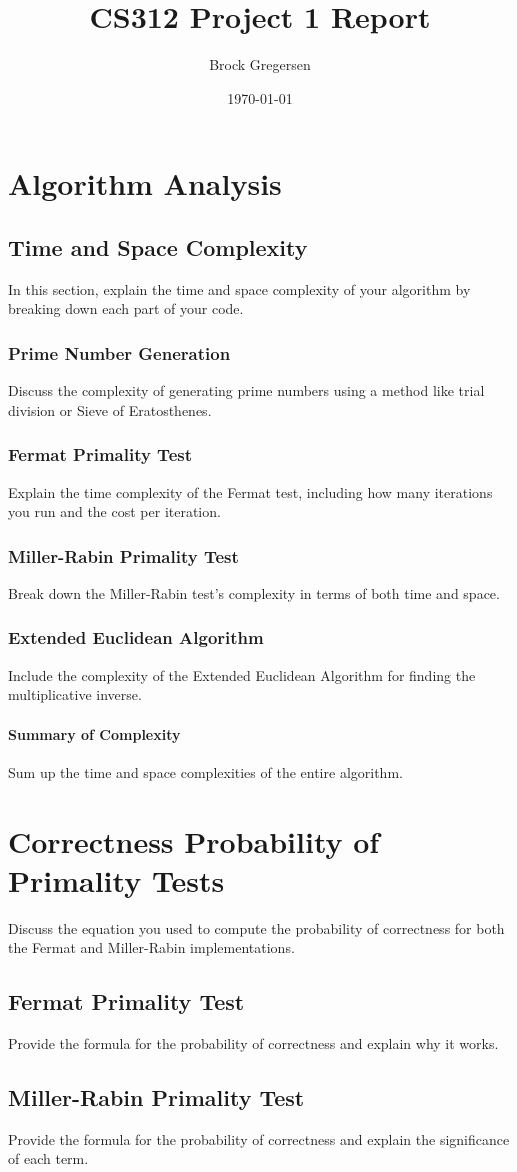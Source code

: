 \documentclass[12pt]{article}
\title{CS312 Project 1 Report}
\author{Brock Gregersen}
\date{\today}
\begin{document}
\maketitle

\tableofcontents
\newpage


\section{Algorithm Analysis}

\subsection{Time and Space Complexity}
In this section, explain the time and space complexity of your algorithm by breaking down each part of your code. 

\subsubsection{Prime Number Generation}
Discuss the complexity of generating prime numbers using a method like trial division or Sieve of Eratosthenes.

\subsubsection{Fermat Primality Test}
Explain the time complexity of the Fermat test, including how many iterations you run and the cost per iteration.

\subsubsection{Miller-Rabin Primality Test}
Break down the Miller-Rabin test's complexity in terms of both time and space.

\subsubsection{Extended Euclidean Algorithm}
Include the complexity of the Extended Euclidean Algorithm for finding the multiplicative inverse.

\paragraph{Summary of Complexity}
Sum up the time and space complexities of the entire algorithm.

\section{Correctness Probability of Primality Tests}
Discuss the equation you used to compute the probability of correctness for both the Fermat and Miller-Rabin implementations.

\subsection{Fermat Primality Test}
Provide the formula for the probability of correctness and explain why it works.

\subsection{Miller-Rabin Primality Test}
Provide the formula for the probability of correctness and explain the significance of each term.
\end{document}
